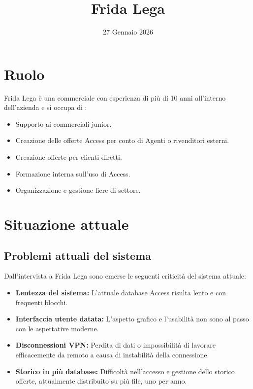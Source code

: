\documentclass[12pt, a4paper]{article} %
\title{Frida Lega}
\date{27 Gennaio 2026}
\begin{document}
\maketitle

\section{Ruolo}
Frida Lega è una commerciale con esperienza di più di 10 anni all'interno
dell'azienda e si occupa di :
\begin{itemize}
      \item Supporto ai commerciali junior.
      \item Creazione delle offerte Access per conto di Agenti o rivenditori esterni.
      \item Creazione offerte per clienti diretti.
      \item Formazione interna sull'uso di Access.
      \item Organizzazione e gestione fiere di settore.
\end{itemize}

\section{Situazione attuale}
\subsection{Problemi attuali del sistema}
Dall'intervista a Frida Lega sono emerse le seguenti criticità del sistema
attuale:
\begin{itemize}
      \item \textbf{Lentezza del sistema:} L'attuale database Access risulta lento e con frequenti blocchi.
      \item \textbf{Interfaccia utente datata:} L'aspetto grafico e l'usabilità non sono al passo con le aspettative moderne.
      \item \textbf{Disconnessioni VPN:} Perdita di dati o impossibilità di lavorare efficacemente da remoto a causa di instabilità della connessione.
      \item \textbf{Storico in più database:} Difficoltà nell'accesso e gestione dello storico offerte, attualmente distribuito su più file, uno per anno.
\end{itemize}
\end{document}
